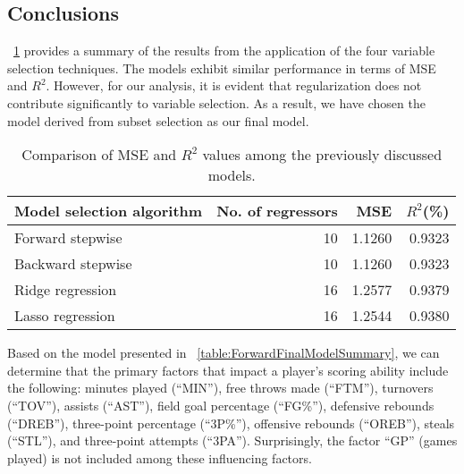 \subsection{Conclusions}

\Tab~\ref{table:RegEvalParams} provides a summary of the results from the application of the four variable selection techniques.
The models exhibit similar performance in terms of MSE and $R^2$. 
However, for our analysis, it is evident that regularization does not contribute significantly to variable selection. 
As a result, we have chosen the model derived from subset selection as our final model.

\begin{table}[h]
	\centering
	\begin{tabular}{|| l | r | r | r ||} 
		\hline
		Model selection algorithm & No. of regressors & MSE & $R^2$(\%) \\
		\hline
		\hline
		Forward stepwise & 10 & 1.1260 & 0.9323 \\
		\hline
		Backward stepwise & 10 & 1.1260 & 0.9323 \\
		\hline
		Ridge regression & 16 & 1.2577 & 0.9379 \\
		\hline
		Lasso regression & 16 & 1.2544 & 0.9380 \\
		\hline
	\end{tabular}
	\caption{Comparison of MSE and $R^2$ values among the previously discussed models.}
	\label{table:RegEvalParams}
\end{table}

Based on the model presented in \Tab~\ref{table:ForwardFinalModelSummary}, we can determine that the primary factors that impact a player's scoring ability include the following: minutes played (``MIN''), free throws made (``FTM''), turnovers (``TOV''), assists (``AST''), field goal percentage (``FG\%''), defensive rebounds (``DREB''), three-point percentage (``3P\%''), offensive rebounds (``OREB''), steals (``STL''), and three-point attempts (``3PA'').
Surprisingly, the factor ``GP'' (games played) is not included among these influencing factors.
